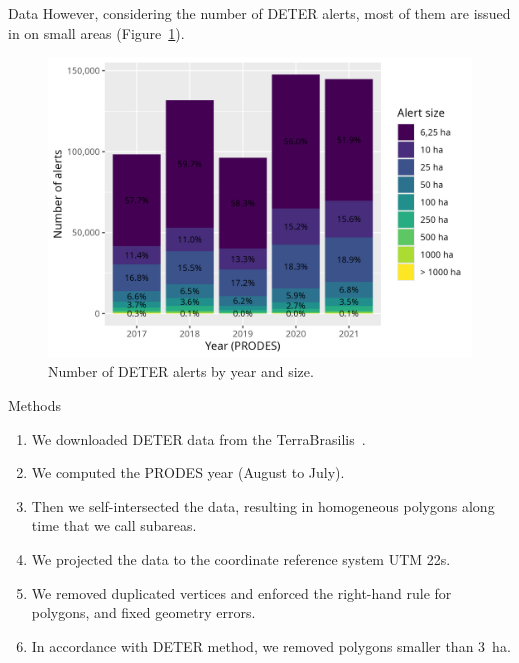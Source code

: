 \documentclass[20pt]{beamer}
\begin{document}
\begin{frame}[fragile,t]
\begin{columns}[t]
\begin{column}{0.33\linewidth}
\begin{block}{Data}
        However, considering the number of DETER alerts, most of them are issued in on small areas (Figure~\ref{fig:deter_warnings_size}).

\begin{figure}[h] 
    \begin{center}
    \includegraphics[width=\linewidth]{./figures/deter_warnings_size.png}
    \caption{Number of DETER alerts by year and size.}
    \label{fig:deter_warnings_size}
    \end{center}
\end{figure}

    \end{block}

\vspace{0.5cm}

    \begin{block}{Methods}
        \begin{enumerate}
            \item We downloaded DETER data from the TerraBrasilis~\cite{f.g.assis2019}. 
            \item We computed the PRODES year (August to July).
            \item Then we self-intersected the data, resulting in homogeneous polygons along time that we call subareas.
            \item We projected the data to the coordinate reference system UTM 22s.
            \item We removed duplicated vertices and enforced the right-hand rule for polygons, and fixed geometry errors.
            \item In accordance with DETER method, we removed polygons smaller than 3~ha.
        \end{enumerate}
    \end{block}


\end{column}
\end{columns}
\end{frame}
\end{document}

